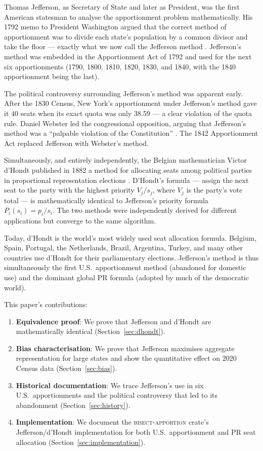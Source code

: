Thomas Jefferson, as Secretary of State and later as President, was the
first American statesman to analyse the apportionment problem mathematically.
His 1792 memo to President Washington argued that the correct method of
apportionment was to divide each state's population by a common divisor
and take the floor --- exactly what we now call the Jefferson method
\citep{schmeckebier1941congressional}.
Jefferson's method was embedded in the Apportionment Act of 1792 and
used for the next six apportionments (1790, 1800, 1810, 1820, 1830,
and 1840, with the 1840 apportionment being the last).

The political controversy surrounding Jefferson's method was apparent
early.
After the 1830 Census, New York's apportionment under Jefferson's method
gave it 40 seats when its exact quota was only 38.59 ---
a clear violation of the quota rule.
Daniel Webster led the congressional opposition, arguing that Jefferson's
method was a ``palpable violation of the Constitution'' \citep{balinski1982fair}.
The 1842 Apportionment Act replaced Jefferson with Webster's method.

Simultaneously, and entirely independently, the Belgian mathematician
Victor d'Hondt published in 1882 a method for allocating seats among
political parties in proportional representation elections
\citep{dhondt1882systeme}.
D'Hondt's formula --- assign the next seat to the party with the highest
priority $V_j/s_j$, where $V_j$ is the party's vote total ---
is mathematically identical to Jefferson's priority formula $P_i(s_i) = p_i/s_i$.
The two methods were independently derived for different applications
but converge to the same algorithm.

Today, d'Hondt is the world's most widely used seat allocation formula.
Belgium, Spain, Portugal, the Netherlands, Brazil, Argentina, Turkey,
and many other countries use d'Hondt for their parliamentary elections.
Jefferson's method is thus simultaneously the first U.S.\ apportionment
method (abandoned for domestic use) and the dominant global PR formula
(adopted by much of the democratic world).

This paper's contributions:
\begin{enumerate}
  \item \textbf{Equivalence proof}: We prove that Jefferson and d'Hondt
    are mathematically identical (Section~\ref{sec:dhondt}).
  \item \textbf{Bias characterisation}: We prove that Jefferson
    maximises aggregate representation for large states and show
    the quantitative effect on 2020 Census data (Section~\ref{sec:bias}).
  \item \textbf{Historical documentation}: We trace Jefferson's use
    in six U.S.\ apportionments and the political controversy
    that led to its abandonment (Section~\ref{sec:history}).
  \item \textbf{Implementation}: We document the \textsc{bisect-apportion}
    crate's Jefferson/d'Hondt implementation for both U.S.\ apportionment
    and PR seat allocation (Section~\ref{sec:implementation}).
\end{enumerate}

